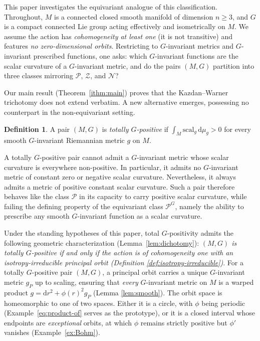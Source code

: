 \documentclass[12pt,a4paper]{amsart}
\theoremstyle{plain}
\theoremstyle{definition}
\newtheorem{definition}[theorem]{Definition}
\theoremstyle{remark}
\newcommand{\ga}{\mathit{g}} %
\begin{document}
This paper investigates the equivariant analogue of this classification. Throughout, $M$ is a connected closed smooth manifold of dimension $n \ge 3$, and $G$ is a compact connected Lie group acting effectively and isometrically on $M$. We assume the action has \emph{cohomogeneity at least one} (it is not transitive) and features \emph{no zero-dimensional orbits}. Restricting to $G$-invariant metrics and $G$-invariant prescribed functions, one asks: which $G$-invariant functions are the scalar curvature of a $G$-invariant metric, and do the pairs $(M,G)$ partition into three classes mirroring $\mathscr{P}$, $\mathscr{Z}$, and $\mathscr{N}$?

Our main result (Theorem~\ref{ithm:main}) proves that the Kazdan--Warner trichotomy does not extend verbatim. A new alternative emerges, possessing no counterpart in the non-equivariant setting. 

\begin{definition}\label{def:totally}
A pair $(M,G)$ is \emph{totally $G$-positive} if $\int_M \mathrm{scal}_{\ga}\,\mathrm{d}\mu_{\ga} > 0$ for every smooth $G$-invariant Riemannian metric $\ga$ on $M$.
\end{definition}

A totally $G$-positive pair cannot admit a $G$-invariant metric whose scalar curvature is everywhere non-positive. In particular, it admits no $G$-invariant metric of constant zero or negative scalar curvature. Nevertheless, it always admits a metric of positive constant scalar curvature. Such a pair therefore behaves like the class $\mathscr{P}$ in its capacity to carry positive scalar curvature, while failing the defining property of the equivariant class $\mathscr{P}^G$, namely the ability to prescribe any smooth $G$-invariant function as a scalar curvature.

Under the standing hypotheses of this paper, total $G$-positivity admits the following geometric characterization (Lemma~\ref{lem:dichotomy}): \emph{$(M, G)$ is totally $G$-positive if and only if the action is of cohomogeneity one with an isotropy-irreducible principal orbit (Definition \ref{def:isotropy-irreducible})}. For a totally $G$-positive pair $(M,G)$, a principal orbit carries a unique $G$-invariant metric $\ga_P$ up to scaling, ensuring that \emph{every} $G$-invariant metric on $M$ is a warped product $\ga = \mathrm{d}r^2 + \phi(r)^2 \ga_P$ (Lemma \ref{lem:smooth}). The orbit space is homeomorphic to one of two spaces. Either it is a circle, with $\phi$ being periodic (Example~\ref{eq:product-of} serves as the prototype), or it is a closed interval whose endpoints are \emph{exceptional} orbits, at which $\phi$ remains strictly positive but $\phi'$ vanishes (Example~\ref{ex:Bohm}). 
\end{document}
